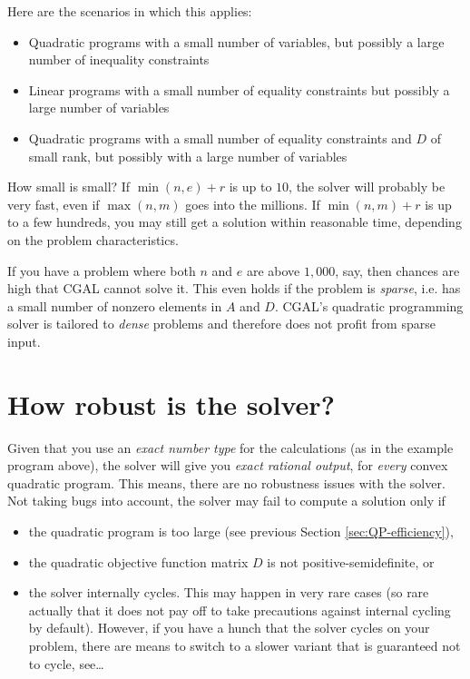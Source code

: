 Here are the scenarios in which this applies:
\begin{itemize}
\item Quadratic programs with a small number of variables, but
  possibly a large number of inequality constraints
\item Linear programs with a small number of equality constraints but
  possibly a large number of variables
\item Quadratic programs with a small number of equality constraints and
  $D$ of small rank, but possibly with a large number of variables
\end{itemize} 

How small is small? If $\min(n,e)+r$ is up to $10$, the solver will
probably be very fast, even if $\max(n,m)$ goes into the millions. 
If $\min(n,m)+r$ is up to a few hundreds, you may still get a solution 
within reasonable time, depending on the problem characteristics.

If you have a problem where both $n$ and $e$ are above
$1,000$, say, then chances are high that CGAL cannot solve it.
This even holds if the problem is \emph{sparse}, i.e. has a small
number of nonzero elements in $A$ and $D$. CGAL's quadratic programming
solver is tailored to \emph{dense} problems and therefore does not 
profit from sparse input.

\section{How robust is the solver?}
Given that you use an \emph{exact number type} for the 
calculations (as in the example program above), the solver
will give you \emph{exact rational output}, for \emph{every}
convex quadratic program. This means, there are no robustness
issues with the solver. Not taking bugs into account, the solver 
may fail to compute a solution only if
\begin{itemize}
\item the quadratic program is too large (see previous Section 
\ref{sec:QP-efficiency}), 
\item the quadratic objective function matrix $D$ is not 
positive-semidefinite, or
\item the solver internally cycles. This may happen in very rare
cases (so rare actually that it does not pay off to take
precautions against internal cycling by default). However, if
you have a hunch that the solver cycles on your problem,
there are means to switch to a slower variant that is guaranteed
not to cycle, see\ldots 
\end{itemize}

